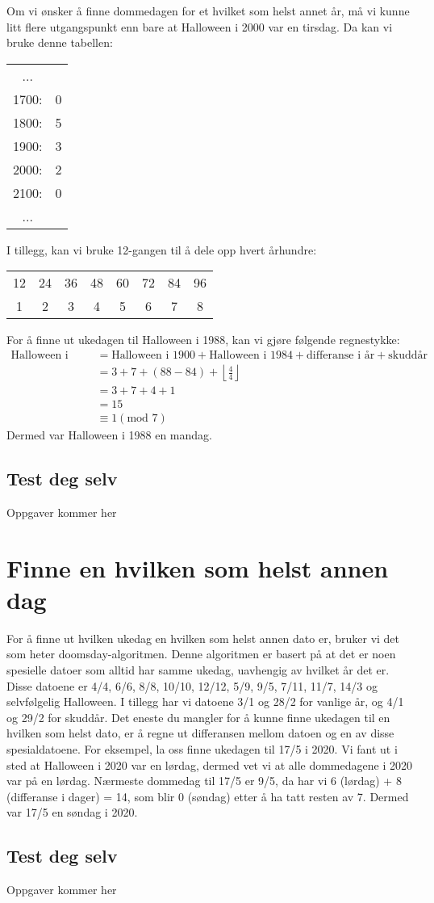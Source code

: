 \documentclass[a4paper,12pt]{article}
\begin{document}
Om vi ønsker å finne dommedagen for et hvilket som helst annet år, må vi kunne litt flere utgangspunkt enn bare at Halloween i 2000 var en tirsdag. Da kan vi bruke denne tabellen:
\begin{center}
\begin{tabular}{c c}
    ... & \\
    1700: & 0 \\
    1800: & 5 \\
    1900: & 3 \\
    2000: & 2 \\
    2100: & 0 \\
    ... & \\   
\end{tabular}
\end{center}
I tillegg, kan vi bruke 12-gangen til å dele opp hvert århundre:
\begin{center}
    \begin{tabular}{c c c c c c c c}
        12 & 24 & 36 & 48 & 60 & 72 & 84 & 96 \\
        1 & 2 & 3 & 4 & 5 & 6 & 7 & 8
    \end{tabular}
\end{center}
For å finne ut ukedagen til Halloween i 1988, kan vi gjøre følgende regnestykke:
\begin{align*}
    \text{Halloween i 1988} &= \text{Halloween i 1900} + \text{Halloween i 1984} + \text{differanse i år} + \text{skuddår} \\
    &= 3 + 7 + (88-84) + \left\lfloor \frac{4}{4} \right\rfloor \\
    &= 3 + 7 + 4 + 1 \\
    &= 15 \\
    &\equiv 1 (\text{mod } 7)
\end{align*}
Dermed var Halloween i 1988 en mandag.
\subsection*{Test deg selv}
Oppgaver kommer her


\section{Finne en hvilken som helst annen dag}
For å finne ut hvilken ukedag en hvilken som helst annen dato er, bruker vi det som heter doomsday-algoritmen. Denne algoritmen er basert på at det er noen spesielle datoer som alltid har samme ukedag, uavhengig av hvilket år det er. Disse datoene er 4/4, 6/6, 8/8, 10/10, 12/12, 5/9, 9/5, 7/11, 11/7, 14/3 og selvfølgelig Halloween. I tillegg har vi datoene 3/1 og 28/2 for vanlige år, og 4/1 og 29/2 for skuddår. Det eneste du mangler for å kunne finne ukedagen til en hvilken som helst dato, er å regne ut differansen mellom datoen og en av disse spesialdatoene. For eksempel, la oss finne ukedagen til 17/5 i 2020. Vi fant ut i sted at Halloween i 2020 var en lørdag, dermed vet vi at alle dommedagene i 2020 var på en lørdag. Nærmeste dommedag til 17/5 er 9/5, da har vi 6 (lørdag) + 8 (differanse i dager) = 14, som blir 0 (søndag) etter å ha tatt resten av 7. Dermed var 17/5 en søndag i 2020.

\subsection*{Test deg selv}
Oppgaver kommer her
\end{document}
